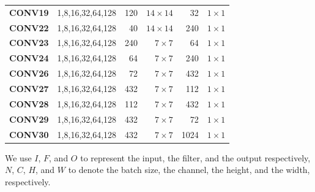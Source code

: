 \begin{table}[]
\begin{threeparttable}
\begin{tabular}{lrrrrr}
\textbf{CONV19} & 1,8,16,32,64,128  & 120   & $14\times 14$   & 32  & $1\times 1$\\
\textbf{CONV22} & 1,8,16,32,64,128  & 40    & $14\times 14$   & 240 & $1\times 1$\\
\textbf{CONV23} & 1,8,16,32,64,128  & 240   & $7\times 7$     & 64  & $1\times 1$\\
\textbf{CONV24} & 1,8,16,32,64,128  & 64    & $7\times 7$     & 240 & $1\times 1$\\
\textbf{CONV26} & 1,8,16,32,64,128  & 72    & $7\times 7$     & 432 & $1\times 1$\\
\textbf{CONV27} & 1,8,16,32,64,128  & 432   & $7\times 7$     & 112 & $1\times 1$\\
\textbf{CONV28} & 1,8,16,32,64,128  & 112   & $7\times 7$     & 432 & $1\times 1$\\
\textbf{CONV29} & 1,8,16,32,64,128  & 432   & $7\times 7$     & 72  & $1\times 1$\\
\textbf{CONV30} & 1,8,16,32,64,128  & 432   & $7\times 7$     & 1024& $1\times 1$\\

\bottomrule
\end{tabular}
\begin{tablenotes}
\item[\dag] We use $I$, $F$, and $O$ to represent the input, the filter, and the output respectively, $N$, $C$, $H$, and $W$
to denote the batch size, the channel, the height, and the width, respectively.
\end{tablenotes}
\end{threeparttable}
\end{table}

